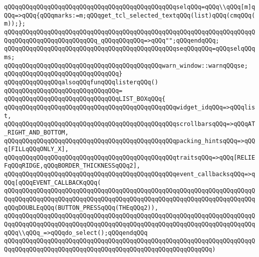 \newline
\verb|qQQqqQQqqQQqqQQqqQQqqQQqqQQqqQQqqQQqqQQqqQQqqQQqselqQQq=qQQq\\qQQq[m]qQQq=>qQQq{qQQqmarks:=m;qQQqget_tcl_selected_textqQQq(list)qQQq(cmqQQq(m));};|\newline
\verb|qQQqqQQqqQQqqQQqqQQqqQQqqQQqqQQqqQQqqQQqqQQqqQQqqQQqqQQqqQQqqQQqqQQqqQQqqQQqqQQqqQQqqQQqqQQqqQQq_qQQqqQQqqQQq=>qQQq"";qQQqendqQQq;|\newline
\newline
\verb|qQQqqQQqqQQqqQQqqQQqqQQqqQQqqQQqqQQqqQQqqQQqqQQqseqQQqqQQq=qQQqselqQQqms;|\newline
\newline
\verb|qQQqqQQqqQQqqQQqqQQqqQQqqQQqqQQqqQQqqQQqqQQqwarn_window::warnqQQqse;|\newline
\verb|qQQqqQQqqQQqqQQqqQQqqQQqqQQqqQQq}|\newline
\newline
\verb|qQQqqQQqqQQqqQQqalsoqQQqfunqQQqlisterqQQq()|\newline
\verb|qQQqqQQqqQQqqQQqqQQqqQQqqQQqqQQq=|\newline
\verb|qQQqqQQqqQQqqQQqqQQqqQQqqQQqqQQqLIST_BOXqQQq{|\newline
\verb|qQQqqQQqqQQqqQQqqQQqqQQqqQQqqQQqqQQqqQQqqQQqqQQqwidget_idqQQq=>qQQqlist,|\newline
\verb|qQQqqQQqqQQqqQQqqQQqqQQqqQQqqQQqqQQqqQQqqQQqqQQqscrollbarsqQQq=>qQQqAT_RIGHT_AND_BOTTOM,|\newline
\verb|qQQqqQQqqQQqqQQqqQQqqQQqqQQqqQQqqQQqqQQqqQQqqQQqpacking_hintsqQQq=>qQQq[FILLqQQqONLY_X],|\newline
\verb|qQQqqQQqqQQqqQQqqQQqqQQqqQQqqQQqqQQqqQQqqQQqqQQqtraitsqQQq=>qQQq[RELIEFqQQqRIDGE,qQQqBORDER_THICKNESSqQQq2],|\newline
\verb|qQQqqQQqqQQqqQQqqQQqqQQqqQQqqQQqqQQqqQQqqQQqqQQqevent_callbacksqQQq=>qQQq[qQQqEVENT_CALLBACKqQQq(|\newline
\verb|qQQqqQQqqQQqqQQqqQQqqQQqqQQqqQQqqQQqqQQqqQQqqQQqqQQqqQQqqQQqqQQqqQQqqQQqqQQqqQQqqQQqqQQqqQQqqQQqqQQqqQQqqQQqqQQqqQQqqQQqqQQqqQQqqQQqqQQqqQQqqQQqDOUBLEqQQq(BUTTON_PRESSqQQq(THEqQQq2)),|\newline
\verb|qQQqqQQqqQQqqQQqqQQqqQQqqQQqqQQqqQQqqQQqqQQqqQQqqQQqqQQqqQQqqQQqqQQqqQQqqQQqqQQqqQQqqQQqqQQqqQQqqQQqqQQqqQQqqQQqqQQqqQQqqQQqqQQqqQQqqQQqqQQqqQQq\\qQQq_=>qQQqdo_select();qQQqendqQQq|\newline
\verb|qQQqqQQqqQQqqQQqqQQqqQQqqQQqqQQqqQQqqQQqqQQqqQQqqQQqqQQqqQQqqQQqqQQqqQQqqQQqqQQqqQQqqQQqqQQqqQQqqQQqqQQqqQQqqQQqqQQqqQQqqQQqqQQq)|\newline
